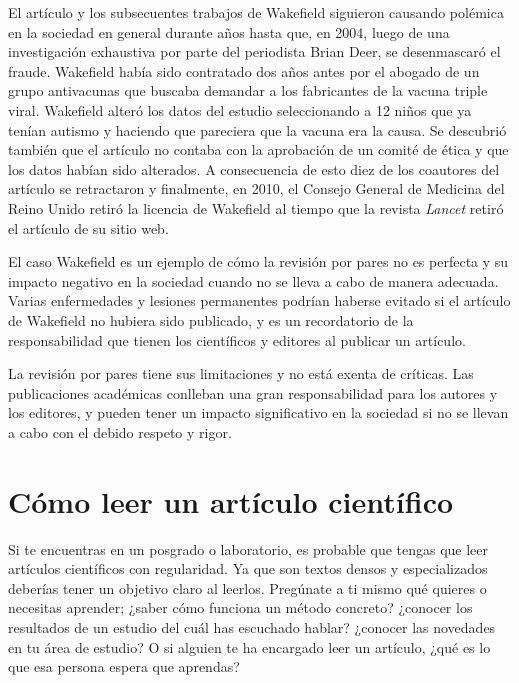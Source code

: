 El artículo y los subsecuentes trabajos de Wakefield siguieron causando polémica
en la sociedad en general durante años hasta que, en 2004, luego de una
investigación exhaustiva por parte del periodista Brian Deer, se desenmascaró el
fraude\cite{Deerc1127}.
Wakefield había sido contratado dos años antes por el abogado de un grupo
antivacunas que buscaba demandar a los fabricantes de la vacuna triple viral.
Wakefield alteró los datos del estudio seleccionando a 12 niños que ya tenían
autismo y haciendo que pareciera que la vacuna era la causa.
Se descubrió también que el artículo no contaba con la aprobación de un comité
de ética y que los datos habían sido alterados.
A consecuencia de esto diez de los coautores del artículo se retractaron y
finalmente, en 2010, el Consejo General de Medicina del Reino Unido retiró la
licencia de Wakefield al tiempo que la revista \emph{Lancet} retiró el artículo
de su sitio web.

El caso Wakefield es un ejemplo de cómo la revisión por pares no es perfecta y
su impacto negativo en la sociedad cuando no se lleva a cabo de manera
adecuada.
Varias enfermedades y lesiones permanentes podrían haberse evitado si el
artículo de Wakefield no hubiera sido publicado, y es un recordatorio de la
responsabilidad que tienen los científicos y editores al publicar un artículo.

\begin{remember}
    La revisión por pares tiene sus limitaciones y no está exenta de críticas.
    Las publicaciones académicas conlleban una gran responsabilidad para los
    autores y los editores, y pueden tener un impacto significativo en la
    sociedad si no se llevan a cabo con el debido respeto y rigor.
\end{remember}

\section{Cómo leer un artículo científico}
\label{sec:comoleer}

Si te encuentras en un posgrado o laboratorio, es probable que tengas que leer
artículos científicos con regularidad.
Ya que son textos densos y especializados deberías tener un objetivo claro al
leerlos.
Pregúnate a ti mismo qué quieres o necesitas aprender; ¿saber cómo funciona un
método concreto? ¿conocer los resultados de un estudio del cuál has escuchado
hablar? ¿conocer las novedades en tu área de estudio? O si alguien te ha
encargado leer un artículo, ¿qué es lo que esa persona espera que aprendas?

